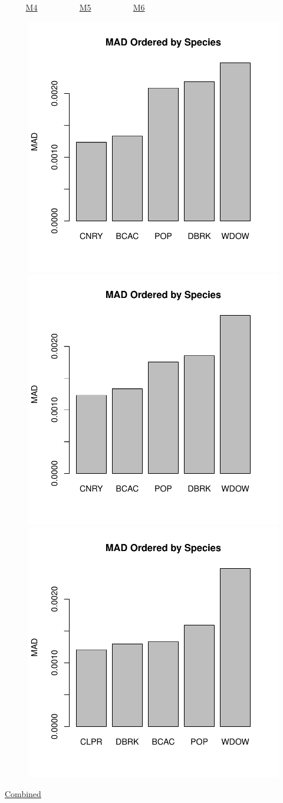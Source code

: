 \documentclass[ xcolor = pdftex, dvipsnames, table ]{beamer}
\begin{document}
\begin{frame}{$~~~~~~~~~~$ \href{https://github.com/gasduster99/sppComp/tree/master/sscRuns/26919781982M4}{M4} $~~~~~~~~~~~~~~~~~~~~$ \href{https://github.com/gasduster99/sppComp/tree/master/sscRuns/26919781982M5}{M5} $~~~~~~~~~~~~~~~~~~~~$ \href{https://github.com/gasduster99/sppComp/tree/master/sscRuns/26919781982M6}{M6} }	
	\begin{figure}[ht!]
        \centering
	\hspace*{-1cm}
        \includegraphics[width=.4\textwidth]{../sscRuns/26919781982M4/sppTailMad68.pdf}
        \includegraphics[width=.4\textwidth]{../sscRuns/26919781982M5/sppTailMad68.pdf}
	\includegraphics[width=.4\textwidth]{../sscRuns/26919781982M6/sppTailMad68.pdf}
	\end{figure}
	\vspace{-1cm}
	\begin{center}
	\Large
	\href{https://github.com/gasduster99/sppComp/tree/master/try1/postSSC/26919781982M4M5M6}{Combined}
	\end{center}
\end{frame}
\end{document}
